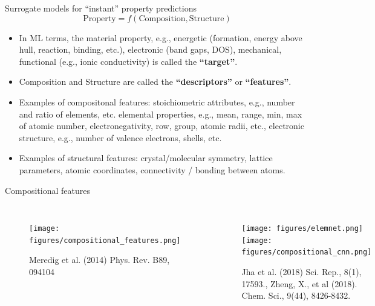 \documentclass[aspectratio=169]{beamer}
\begin{document}
    \begin{frame}{Surrogate models for “instant” property predictions}
        \begin{equation*}
            \mathrm{Property} = f(\mathrm{Composition}, \mathrm{Structure})
        \end{equation*}
        \begin{itemize}
            \item In ML terms, the material property, e.g., energetic (formation, energy above hull, reaction, binding, etc.), electronic (band gaps, DOS), mechanical, functional (e.g., ionic conductivity) is called the \textbf{``target''}.
            \item Composition and Structure are called the \textbf{``descriptors''} or \textbf{``features''}.
            \item Examples of compositonal features: stoichiometric attributes, e.g., number and ratio of elements, etc. elemental properties, e.g., mean, range, min, max of atomic number, electronegativity, row, group, atomic radii, etc., electronic structure, e.g., number of valence electrons, shells, etc.
            \item Examples of structural features: crystal/molecular symmetry, lattice parameters, atomic coordinates, connectivity / bonding between atoms.
        \end{itemize}
    \end{frame}


    \begin{frame}{Compositional features}

        \begin{columns}
            \begin{figure}
                \centering
                \texttt{[image: figures/compositional\_features.png]}
                \caption{Meredig et al. (2014) Phys. Rev. B89, 094104}
            \end{figure}
            \begin{figure}
                \centering
                \texttt{[image: figures/elemnet.png]}
                \texttt{[image: figures/compositional\_cnn.png]}
                \caption{Jha et al. (2018) Sci. Rep., 8(1), 17593., Zheng, X., et al (2018). Chem. Sci., 9(44), 8426-8432.}
            \end{figure}
        \end{columns}
    \end{frame}
\end{document}
